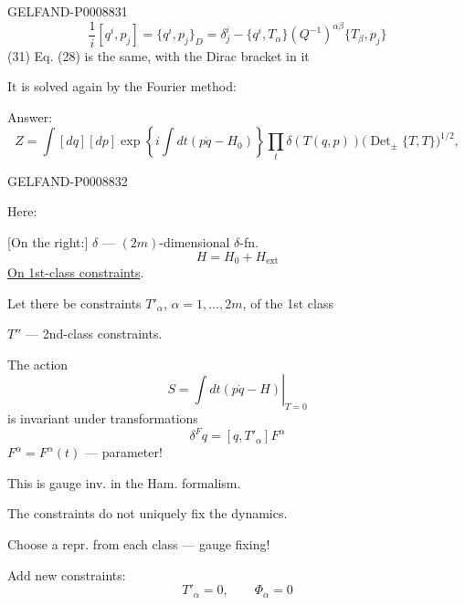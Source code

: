 \begin{GelfandAdjacentEvidence}{GELFAND-P000883}{1}
\begin{equation*}
\frac{1}{i}[q^i,p_j]=\{q^i,p_j\}_D
=\delta^i_j-\{q^i,T_\alpha\}(Q^{-1})^{\alpha\beta}\{T_\beta,p_j\}
\tag{30}
\end{equation*}
(31) Eq. (28) is the same, with the Dirac bracket in it

It is solved again by the Fourier method:

Answer:
\begin{equation*}
Z=\int[dq][dp]\exp\left\{i\int dt(p\dot q-H_0)\right\}
\prod_t\delta(T(q,p))
\bigl(\operatorname{Det}_{\pm}\{T,T\}\bigr)^{1/2},
\tag{32}
\end{equation*}
\end{GelfandAdjacentEvidence}
\begin{GelfandAdjacentEvidence}{GELFAND-P000883}{2}


Here:

[On the right:] $\delta$ --- $(2m)$-dimensional $\delta$-fn.
\begin{equation*}
H=H_0+H_{\mathrm{ext}}
\tag{33}
\end{equation*}
\uline{On 1st-class constraints}.

Let there be constraints $T'_\alpha$, $\alpha=1,\ldots,2m$, of the 1st class

$T''$ --- 2nd-class constraints.

The action
\begin{equation*}
S=\left.\int dt(p\dot q-H)\right|_{T=0}
\tag{34}
\end{equation*}
is invariant under transformations
\begin{equation*}
\delta^F q=[q,T'_\alpha]F^\alpha
\tag{35}
\end{equation*}
$F^\alpha=F^\alpha(t)$ --- parameter!

This is gauge inv. in the Ham. formalism.

The constraints do not uniquely fix the dynamics.

Choose a repr. from each class --- gauge fixing!

Add new constraints:
\begin{equation*}
T'_\alpha=0,\qquad \Phi_\alpha=0
\tag{36}
\end{equation*}
\end{GelfandAdjacentEvidence}

